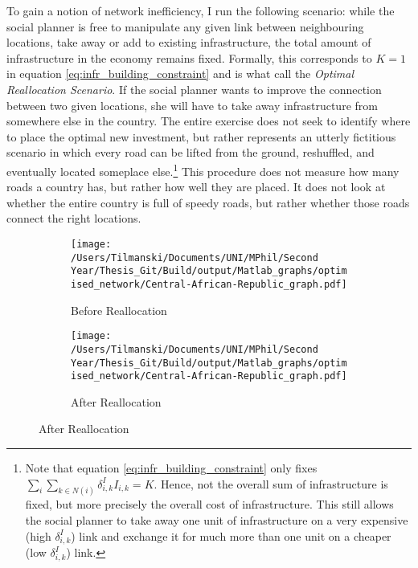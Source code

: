 \documentclass[11pt, oneside]{article}   	%
\begin{document}
To gain a notion of network inefficiency, I run the following scenario: while the social planner is free to manipulate any given link between neighbouring locations, take away or add to existing infrastructure, the total amount of infrastructure in the economy remains fixed. Formally, this corresponds to $K = 1$ in equation \ref{eq:infr_building_constraint} and is what \citeauthor{fajgelbaum_optimal_2017} call the \textit{Optimal Reallocation Scenario}. If the social planner wants to improve the connection between two given locations, she will have to take away infrastructure from somewhere else in the country. The entire exercise does not seek to identify where to place the optimal new investment, but rather represents an utterly fictitious scenario in which every road can be lifted from the ground, reshuffled, and eventually located someplace else.\footnote{Note that equation \ref{eq:infr_building_constraint} only fixes $\sum_{i}^{}\sum_{k \in N(i)}^{} \delta_{i,k}^{I}I_{i,k} = K$. Hence, not the overall sum of infrastructure is fixed, but more precisely the overall cost of infrastructure. This still allows the social planner to take away one unit of infrastructure on a very expensive (high $\delta_{i,k}^{I}$) link and exchange it for much more than one unit on a cheaper (low $\delta_{i,k}^{I}$) link.} This procedure does not measure how many roads a country has, but rather how well they are placed. It does not look at whether the entire country is full of speedy roads, but rather whether those roads connect the right locations.

\begin{figure}
\centering
\caption{Optimal Reallocation Scenario in the Central African Republic}

\begin{subfigure}[c]{0.48\textwidth}
\texttt{[image: /Users/Tilmanski/Documents/UNI/MPhil/Second Year/Thesis\_Git/Build/output/Matlab\_graphs/optimised\_network/Central-African-Republic\_graph.pdf]}
\caption{Before Reallocation}
\label{fig:before_restructure}
\end{subfigure}
\begin{subfigure}[c]{0.48\textwidth}
\texttt{[image: /Users/Tilmanski/Documents/UNI/MPhil/Second Year/Thesis\_Git/Build/output/Matlab\_graphs/optimised\_network/Central-African-Republic\_graph.pdf]}
\caption{After Reallocation}
\label{fig:after_restructure}
\end{subfigure}
\label{fig:restructure_centralafricanrepublic}
\end{figure}
\end{document}
